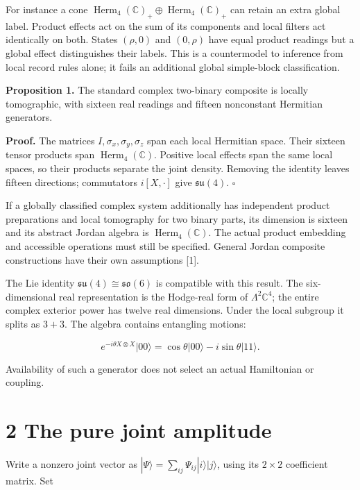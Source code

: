 \documentclass[
  11pt,
  a4paper,
]{article}
\begin{document}
For instance a cone \(\operatorname{Herm}_4(\mathbb C)_+\oplus\operatorname{Herm}_4(\mathbb C)_+\) can retain an extra global label. Product effects act on the sum of its components and local filters act identically on both. States \((\rho,0)\) and \((0,\rho)\) have equal product readings but a global effect distinguishes their labels. This is a countermodel to inference from local record rules alone; it fails an additional global simple-block classification.

\textbf{Proposition 1.} The standard complex two-binary composite is locally tomographic, with sixteen real readings and fifteen nonconstant Hermitian generators.

\textbf{Proof.} The matrices \(I,\sigma_x,\sigma_y,\sigma_z\) span each local Hermitian space. Their sixteen tensor products span \(\operatorname{Herm}_4(\mathbb C)\). Positive local effects span the same local spaces, so their products separate the joint density. Removing the identity leaves fifteen directions; commutators \(i[X,\cdot]\) give \(\mathfrak{su}(4)\). \(\square\)

If a globally classified complex system additionally has independent product preparations and local tomography for two binary parts, its dimension is sixteen and its abstract Jordan algebra is \(\operatorname{Herm}_4(\mathbb C)\). The actual product embedding and accessible operations must still be specified. General Jordan composite constructions have their own assumptions {[}1{]}.

The Lie identity \(\mathfrak{su}(4)\cong\mathfrak{so}(6)\) is compatible with this result. The six-dimensional real representation is the Hodge-real form of \(\Lambda^2\mathbb C^4\); the entire complex exterior power has twelve real dimensions. Under the local subgroup it splits as \(3+3\). The algebra contains entangling motions:

\[e^{-i\theta X\otimes X}|00\rangle
=\cos\theta|00\rangle-i\sin\theta|11\rangle.\]

Availability of such a generator does not select an actual Hamiltonian or coupling.

\section{2 The pure joint amplitude}\label{the-pure-joint-amplitude}

Write a nonzero joint vector as \(|\Psi\rangle=\sum_{ij}\Psi_{ij}|i\rangle|j\rangle\), using its \(2\times2\) coefficient matrix. Set
\end{document}
